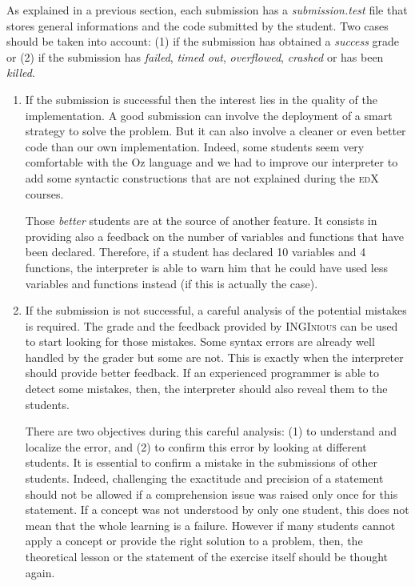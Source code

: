 \documentclass[11pt,a4paper,twoside,openright]{report}
\begin{document}
As explained in a previous section, each submission has a 
\textit{submission.test} file that stores general informations and the code 
submitted by the student. Two cases should be taken into account: (1) if the 
submission has obtained a \textit{success} grade or (2) if the submission has 
\textit{failed}, \textit{timed out}, \textit{overflowed}, \textit{crashed} or 
has been \textit{killed}.
\begin{enumerate}
 \item If the submission is successful then the interest lies in the quality 
of the implementation. A good submission can involve the deployment of a smart 
strategy to solve the problem. But it can also involve a cleaner or even better 
code than our own implementation. Indeed, some students seem very comfortable 
with the Oz language and we had to improve our interpreter to add some 
syntactic constructions that are not explained during the \textsc{edX} courses.

Those \textit{better} students are at the source of another feature. It 
consists in providing also a feedback on the number of variables and functions 
that have been declared. Therefore, if a student has declared 10 variables and 4 
functions, the interpreter is able to warn him that he could have used less 
variables and functions instead (if this is actually the case).
  
  \item If the submission is not successful, a careful analysis of 
the potential mistakes is required. The grade and the feedback provided by 
\textsc{INGInious} can be used to start looking for those mistakes. Some syntax 
errors are already well handled by the grader but some are not. This is exactly 
when the interpreter should provide better feedback. If an experienced 
programmer is able to detect some  mistakes, then, the interpreter should also 
reveal them to the students.

  There are two objectives during this careful analysis: (1) to understand and 
localize the error, and (2) to confirm this error by looking at different 
students. It is essential to confirm a mistake in the submissions of other 
students. Indeed, challenging the exactitude and precision of a statement 
should not be allowed if a comprehension issue was raised only once for this 
statement. If a concept was not understood by only one student, this does not mean 
that the whole learning is a failure. However if many students cannot apply a 
concept or provide the right solution to a problem, then, the theoretical 
lesson or the statement of the exercise itself should be thought again.
\end{enumerate}
\end{document}
